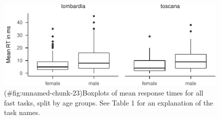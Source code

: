 \begin{appendix}
\begin{figure}
\centering
\includegraphics{self_compassion_files/figure-latex/unnamed-chunk-23-1.pdf}
\caption{(\#fig:unnamed-chunk-23)Boxplots of mean response times for all
fast tasks, split by age groups. See Table 1 for an explanation of the
task names.}
\end{figure}
\end{appendix}

